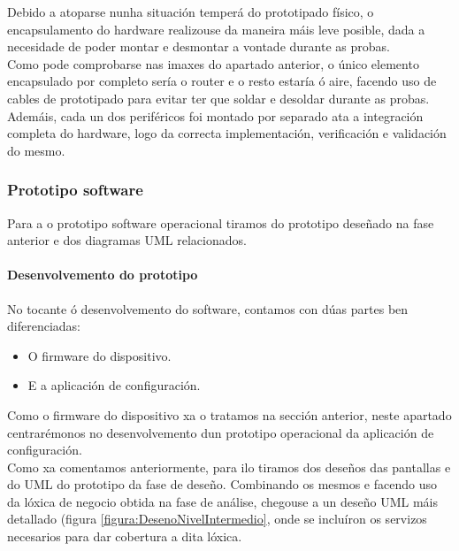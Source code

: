    Debido a atoparse nunha situación temperá do prototipado físico, o
   encapsulamento do hardware realizouse da maneira máis leve posible, dada a
   necesidade de poder montar e desmontar a vontade durante as probas. \\
   
   Como pode comprobarse nas imaxes do apartado anterior, o único elemento
   encapsulado por completo sería o router e o resto estaría ó aire, facendo uso
   de cables de prototipado para evitar ter que soldar e desoldar durante as
   probas. \\
   
   Ademáis, cada un dos periféricos foi montado por separado ata a integración
   completa do hardware, logo da correcta implementación, verificación e
   validación do mesmo.

  \subsubsection{Prototipo software}
  
  Para a o prototipo software operacional tiramos do prototipo deseñado na fase
  anterior e dos diagramas UML relacionados.

   \paragraph{Desenvolvemento do prototipo}
   
   No tocante ó desenvolvemento do software, contamos con dúas partes ben
   diferenciadas:
   
   \begin{itemize}
    \item O firmware do dispositivo.
    \item E a aplicación de configuración.
   \end{itemize}
   
   Como o firmware do dispositivo xa o tratamos na sección anterior, neste
   apartado centrarémonos no desenvolvemento dun prototipo operacional da
   aplicación de configuración. \\
   
   Como xa comentamos anteriormente, para ilo tiramos dos deseños das pantallas
   e do UML do prototipo da fase de deseño. Combinando os mesmos e facendo uso
   da lóxica de negocio obtida na fase de análise, chegouse a un deseño UML máis
   detallado (figura \ref{figura:DesenoNivelIntermedio}, onde se incluíron os
   servizos necesarios para dar cobertura a dita lóxica. \\
   
